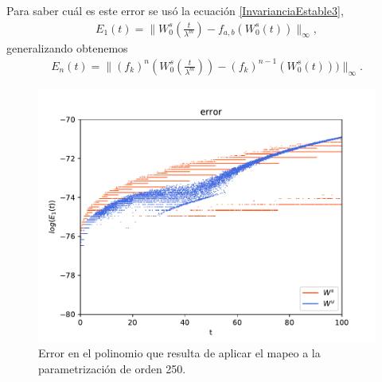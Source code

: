 \documentclass[11pt]{beamer}
\theoremstyle{definition}
\begin{document}
\begin{frame}
Para saber cuál es este error se usó la ecuación \eqref{InvarianciaEstable3},
\begin{eqnarray}
E_{1}(t)=\bigg\| W_{0}^{s}\left(\frac{t}{\lambda^{m}}\right)-f_{a,b}(W_{0}^{s}(t))\bigg\|_{\infty},
\label{error-1aplicacion}
\end{eqnarray}
generalizando obtenemos
\begin{eqnarray}
E_{n}(t)=\bigg\| (f_{k})^{n}\left(W_{0}^{s}\left(\frac{t}{\lambda^{m}}\right)\right)- (f_{k})^{n-1}(W_{0}^{s}(t)))\bigg\|_{\infty}.
\label{error-n-aplicacion}
\end{eqnarray}
\end{frame}
\begin{frame}
\begin{figure}[h!]
\centering
\includegraphics[scale=0.6]{error1ite.pdf}
\caption{Error en el polinomio que resulta de aplicar el mapeo a la parametrización de orden 250.}
\label{error-1iteracion}
\end{figure}
\end{frame}
\end{document}
